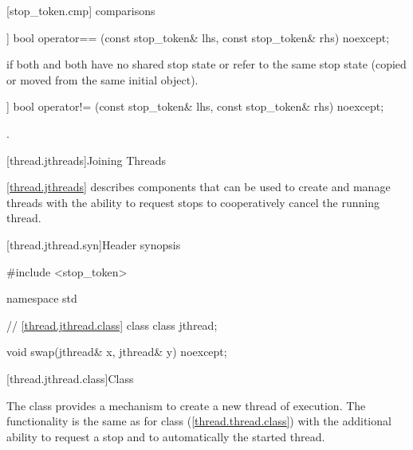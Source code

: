 {%
[stop_token.cmp]{ comparisons}

%
\begin{itemdecl}
[[nodiscard]] bool operator== (const stop_token& lhs, const stop_token& rhs) noexcept;
\end{itemdecl}
\begin{itemdescr}
  \pnum\returns {} if both  and  both
                have no shared stop state or refer to the same stop state
                (copied or moved from the same initial  object).
\end{itemdescr}

%
\begin{itemdecl}
[[nodiscard]] bool operator!= (const stop_token& lhs, const stop_token& rhs) noexcept;
\end{itemdecl}
\begin{itemdescr}
  \pnum\returns {}.
\end{itemdescr}


\clearpage

[thread.jthreads]{Joining Threads}


\pnum
\ref{thread.jthreads} describes components that can be used to create and manage threads
with the ability to request stops to cooperatively cancel the running thread.

[thread.jthread.syn]{Header  synopsis}
%

\begin{codeblock}
#include <stop_token>

namespace std {
  // \ref{thread.jthread.class} class 
  class jthread;

  void swap(jthread& x, jthread& y) noexcept;
}
\end{codeblock}


[thread.jthread.class]{Class }

\pnum
The class  provides a mechanism
to create a new thread of execution.
The functionality is the same as for class  (\ref{thread.thread.class})
with the additional ability to request a stop and to
automatically  the started thread.

}

